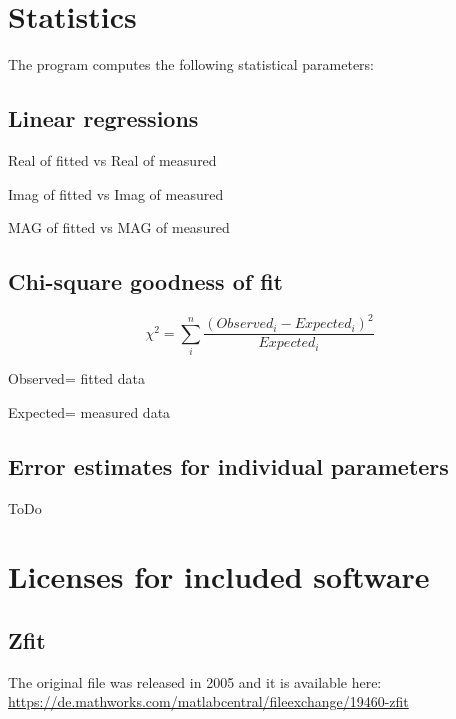 \documentclass[10pt,a4paper,oneside]{memoir}
\begin{document}
\chapter{Statistics}

The program computes the following statistical parameters:

\section{Linear regressions}

Real of fitted vs Real of measured

Imag of fitted vs Imag of measured

MAG of fitted vs MAG of measured

\section{Chi-square goodness of fit}

\[ \chi^2 = \sum_i^n{\dfrac{(Observed_i-Expected_i)^2}{Expected_i}} \]

Observed= fitted data

Expected= measured data

\section{Error estimates for individual parameters}

ToDo


\newpage{}
\chapter{Licenses for included software}

\section{Zfit}

The original file was released in 2005 and it is available here:\\

\url{https://de.mathworks.com/matlabcentral/fileexchange/19460-zfit}
\end{document}
